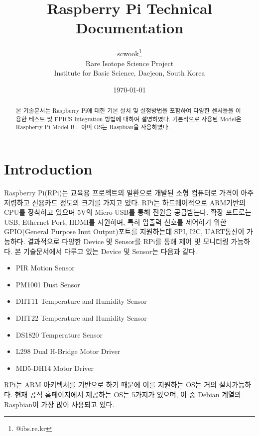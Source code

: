 \documentclass[11pt
  , a4paper
  , article
  , oneside
]{memoir}
\begin{document}
\newcommand{\technumber}{
  RAON Control-Document Series\\
  Revision : v1.0,   Release : a fixed date}
\title{\textbf{Raspberry Pi Technical Documentation}}

\author{scwook\thanks{@ibs.re.kr} \\

  Rare Isotope Science Project\\
  Institute for Basic Science, Daejeon, South Korea
}
\date{\today}

\renewcommand{\maketitlehooka}{\begin{flushright}\textsf{\technumber}\end{flushright}}

\maketitle

\begin{abstract}
본 기술문서는 Raspberry Pi에 대한 기본 설치 및 설정방법을 포함하여 다양한 센서들을 이용한 테스트 및 
EPICS Integration 방법에 대하여 설명하였다. 기본적으로 사용된 Model은 Raspberry Pi Model B+ 이며  
OS는 Raspbian을 사용하였다.
\end{abstract}

\chapter{Introduction}
Raspberry Pi(RPi)는 교육용 프로젝트의 일환으로 개발된 소형 컴퓨터로 가격이 아주 저렴하고 신용카드 정도의
크기를 가지고 있다. RPi는 하드웨어적으로 ARM기반의 CPU를 장착하고 있으며 5V의 Micro USB를 통해 전원을 
공급받는다. 확장 포트로는 USB, Ethernet Port, HDMI를 지원하며, 특히 입출력 신호를 제어하기 위한 
GPIO(General Purpose Inut Output)포트를 지원하는데 SPI, I2C, UART통신이 가능하다. 결과적으로 다양한
Device 및 Sensor를 RPi를 통해 제어 및 모니터링 가능하다. 본 기술문서에서 다루고 있는 Device 및 Sensor는
다음과 같다.
\begin{itemize}
\item PIR Motion Sensor\citep{PIR}
\item PM1001 Dust Sensor\cite{PM1001}
\item DHT11 Temperature and Humidity Sensor\cite{DHT11}
\item DHT22 Temperature and Humidity Sensor\cite{DHT22}
\item DS1820 Temperature Sensor\cite{DS1820}
\item L298 Dual H-Bridge Motor Driver\cite{L298}
\item MD5-DH14 Motor Driver\cite{MD5DH14}
\end{itemize}
RPi는 ARM 아키텍쳐를 기반으로 하기 때문에 이를 지원하는 OS는 거의 설치가능하다. 현재 공식 홈페이지에서
제공하는 OS는 5가지가 있으며, 이 중 Debian 계열의 Raspbian이 가장 많이 사용되고 있다.
\end{document}

